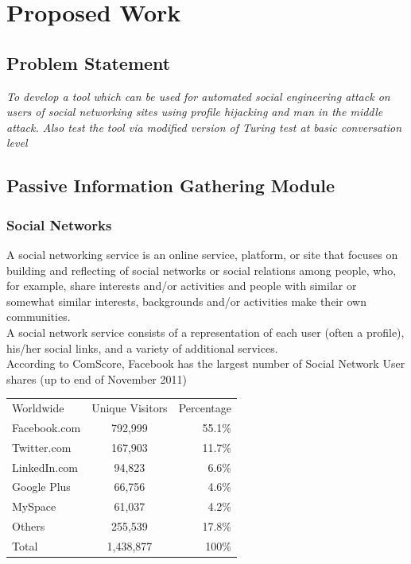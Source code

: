 \chapter{Proposed Work}

\section{Problem Statement}
\emph{To develop a tool which can be used for automated social engineering attack on users of social networking sites using profile hijacking and man in the middle attack. Also test the tool via modified version of Turing test at basic conversation level}

\section{Passive Information Gathering Module}

\subsection{Social Networks}
A social networking service is an online service, platform, or site that focuses on building and reflecting of 
social networks or social relations among people, who, for example, share interests and/or activities and people 
with similar or somewhat similar interests, backgrounds and/or activities make their own communities.\\[0.5cm]
A social network service consists of a representation of each user (often a
profile), his/her social links, and a variety of additional services.\\[0.5cm]
According to ComScore, Facebook has the largest number of Social Network User shares (up to end of November 2011)\cite{marketshare}

\begin{table}[h]\large
\centering
\begin{tabular}{l | c | r}
Worldwide & Unique Visitors & Percentage\\
Facebook.com & 792,999 	& 55.1\%\\
Twitter.com & 167,903 & 11.7\%\\
LinkedIn.com & 94,823 & 6.6\%\\
Google Plus & 66,756 & 4.6\%\\
MySpace & 61,037 & 4.2\%\\
Others & 255,539 & 17.8\%\\
Total & 1,438,877 & 100\%\\
\end{tabular}
\end{table}

